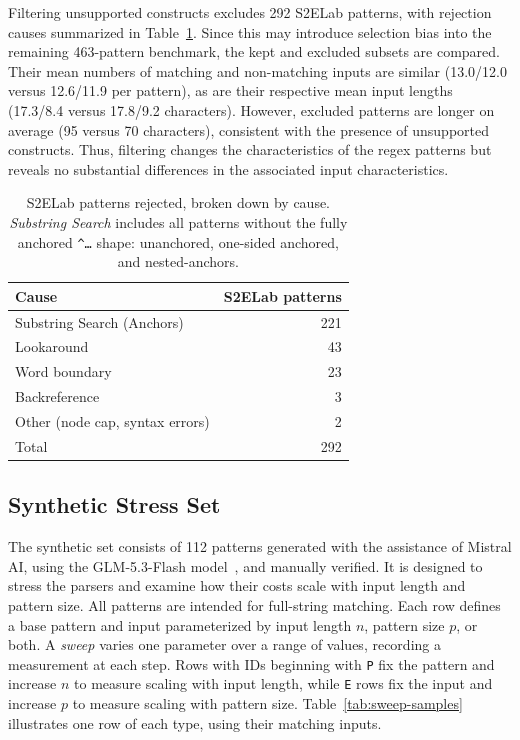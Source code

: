 Filtering unsupported constructs excludes 292 S2ELab patterns,
with rejection causes summarized in
Table~\ref{tab:corpus-rejection-causes}.
Since this may introduce selection bias into the
remaining 463-pattern benchmark, the kept
and excluded subsets are compared.
Their mean numbers of matching and non-matching inputs
are similar (13.0/12.0 versus 12.6/11.9 per pattern),
as are their respective mean input lengths
(17.3/8.4 versus 17.8/9.2 characters).
However, excluded patterns are longer on average
(95 versus 70 characters), consistent with the
presence of unsupported constructs.
Thus, filtering changes the characteristics of the
regex patterns but reveals no substantial differences
in the associated input characteristics.

\begin{table}[H]
\centering
\small
\begin{tabular*}{\textwidth}{@{\extracolsep{\fill}} lr}
\hline
Cause & S2ELab patterns \\
\hline
Substring Search (Anchors)                  & 221 \\
Lookaround                                  &  43 \\
Word boundary                               &  23 \\
Backreference                               &   3 \\
Other (node cap, syntax errors)             &   2 \\
\hline
Total                                       & 292 \\
\hline
\end{tabular*}
\caption{S2ELab patterns rejected, broken down by cause.
\emph{Substring Search} includes all patterns without the fully anchored
\texttt{\textasciicircum\ldots\textdollar} shape:
unanchored, one-sided anchored, and nested-anchors.}
\label{tab:corpus-rejection-causes}
\end{table}



%
%
%


\subsection{Synthetic Stress Set}
\label{sec:eval-pathological}


The synthetic set consists of 112 patterns generated
with the assistance of Mistral AI, using the
GLM-5.3-Flash model~\citep{glm-5-3-flash},
and manually verified.
It is designed to stress the parsers and examine
how their costs scale with input length and pattern size.
All patterns are intended for full-string matching.
Each row defines a base pattern and input
parameterized by input length $n$, pattern size $p$, or both.
A \emph{sweep} varies one parameter over a range of values,
recording a measurement at each step.
Rows with IDs beginning with \texttt{P} fix the pattern
and increase $n$ to measure scaling with input length,
while \texttt{E} rows fix the input and increase $p$
to measure scaling with pattern size.
Table~\ref{tab:sweep-samples} illustrates one row of each type,
using their matching inputs.

